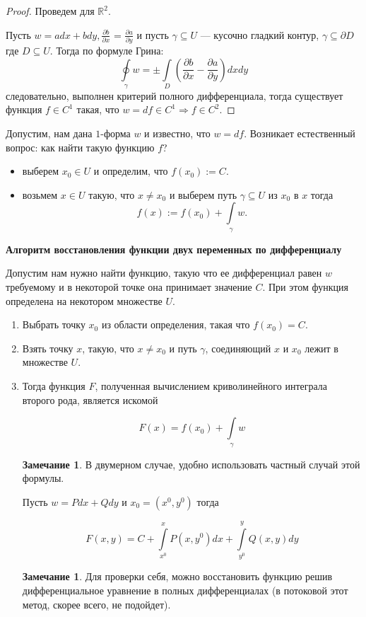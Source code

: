 \documentclass[a5paper]{article}
\newcounter{through}
\theoremstyle{plain}
\theoremstyle{definition}
\newtheorem{remark}[through]{Замечание}
\numberwithin{through}{section}
\numberwithin{equation}{section}
\begin{document}
\begin{proof}
	Проведем для $\mathbb{R}^2$.
	
	Пусть $w = adx + bdy, \frac{\partial b}{\partial x}$ = $\frac{\partial a}{\partial y}$ и
	пусть $\gamma \subseteq U$ --- кусочно гладкий контур, $\gamma \subseteq \partial D$
	где $D \subseteq U$. Тогда по формуле Грина:
	\[ \oint\limits_\gamma w = \pm \int\limits_D \left( \frac{\partial b}{\partial x} -
	\frac{\partial a}{\partial y} \right) dxdy \]
	следовательно, выполнен критерий полного дифференциала, тогда существует функция 
	$f \in C^1$ такая, что $w = df \in C^1 \Rightarrow f \in C^2$.
\end{proof}

Допустим, нам дана $1$-форма $w$ и известно, что $w = df$. Возникает естественный вопрос: 
как найти такую функцию $f$?
\begin{itemize}
	\item
	выберем $x_0 \in U$ и определим, что $f(x_0) := C$.
	
	\item
	возьмем $x \in U$ такую, что $x \ne x_0$ и выберем путь $\gamma \subseteq U$ из $ x_0 $ в $x$
	тогда \[ f(x) := f(x_0) + \int\limits_\gamma w. \]
\end{itemize}

{\bf Алгоритм восстановления функции двух переменных по дифференциалу}

Допустим нам нужно найти функцию, такую что ее дифференциал равен $w$ требуемому и в некоторой точке она принимает значение $C$. При этом функция определена на некотором множестве $U$.

\begin{enumerate}
	\item Выбрать точку $x_0$ из области определения, такая что $f(x_0)=C$.
	
	\item Взять точку $x$, такую, что $x \not= x_0$ и путь $\gamma$, соединяющий $x$ и $x_0$ лежит в множестве $U$.
	
	\item Тогда функция $F$, полученная вычислением криволинейного интеграла второго рода, является искомой
	
	\begin{equation*}
	F(x) = f(x_0) + \int\limits_{\gamma} w
	\end{equation*}
	
	\begin{remark} \label{v1c1}
		В двумерном случае, удобно использовать частный случай этой формулы. 
		
		Пусть $w=Pdx + Qdy$ и $x_0=(x^0, y^0)$ тогда
		
		\begin{equation*}
		F(x, y) = C + \int\limits_{x^0}^{x}P(x, y^0)dx + \int\limits_{y^0}^{y} Q(x, y) dy
		\end{equation*}
	\end{remark}
	
	\begin{remark}
		Для проверки себя, можно восстановить функцию решив дифференциальное уравнение в полных дифференциалах (в потоковой этот метод, скорее всего, не подойдет).
	\end{remark}
\end{enumerate}
\end{document}
